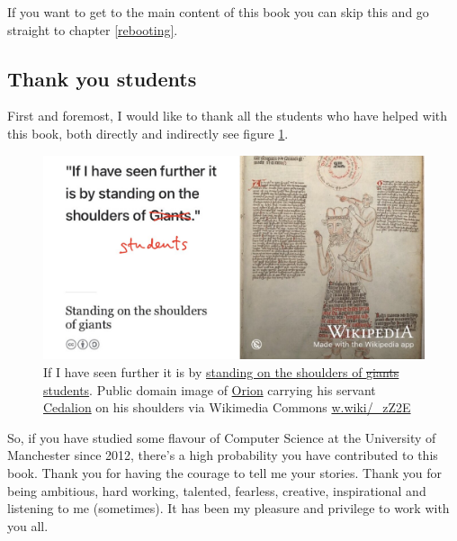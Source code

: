 \documentclass[
]{book}
\begin{document}
If you want to get to the main content of this book you can skip this and go straight to chapter \ref{rebooting}.

\hypertarget{students}{%
\subsection{Thank you students}\label{students}}

First and foremost, I would like to thank all the students who have helped with this book, both directly and indirectly see figure \ref{fig:giants-fig}.

\begin{figure}

{\centering \includegraphics[width=1\linewidth]{images/standing-on-the-shoulders-of-students} 

}

\caption{If I have seen further it is by \href{https://en.wikipedia.org/wiki/Standing_on_the_shoulders_of_giants}{standing on the shoulders of \sout{giants} students}. \citep{newton} Public domain image of \href{https://en.wikipedia.org/wiki/Orion_(mythology)}{Orion} carrying his servant \href{https://en.wikipedia.org/wiki/Cedalion}{Cedalion} on his shoulders via Wikimedia Commons \href{https://w.wiki/_zZ2E}{w.wiki/\_zZ2E}}\label{fig:giants-fig}
\end{figure}



So, if you have studied some flavour of Computer Science at the University of Manchester since 2012, there's a high probability you have contributed to this book. Thank you for having the courage to tell me your stories. Thank you for being ambitious, hard working, talented, fearless, creative, inspirational and listening to me (sometimes). It has been my pleasure and privilege to work with you all.
\end{document}
